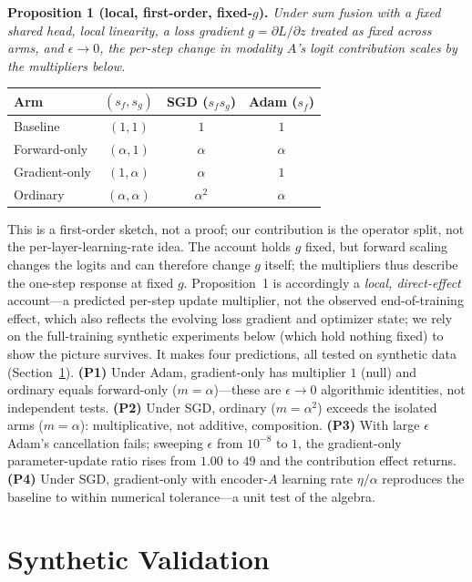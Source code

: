 \documentclass[conference]{IEEEtran}
\begin{document}
\noindent\textbf{Proposition 1 (local, first-order, fixed-$g$).} \emph{Under sum fusion with a fixed shared head, local linearity, a loss gradient $g=\partial L/\partial z$ treated as fixed across arms, and $\epsilon\!\to\!0$, the per-step change in modality $A$'s logit contribution scales by the multipliers below.}
\begin{center}\footnotesize
\begin{tabular}{@{}lccc@{}}
\toprule
Arm & $(s_f,s_g)$ & SGD ($s_f s_g$) & Adam ($s_f$)\\
\midrule
Baseline      & $(1,1)$           & $1$        & $1$\\
Forward-only  & $(\alpha,1)$      & $\alpha$   & $\alpha$\\
Gradient-only & $(1,\alpha)$      & $\alpha$   & $1$\\
Ordinary      & $(\alpha,\alpha)$ & $\alpha^2$ & $\alpha$\\
\bottomrule
\end{tabular}
\end{center}

This is a first-order sketch, not a proof; our contribution is the operator split, not the per-layer-learning-rate idea. The account holds $g$ fixed, but forward scaling changes the logits and can therefore change $g$ itself; the multipliers thus describe the one-step response at fixed $g$. Proposition~1 is accordingly a \emph{local, direct-effect} account---a predicted per-step update multiplier, not the observed end-of-training effect, which also reflects the evolving loss gradient and optimizer state; we rely on the full-training synthetic experiments below (which hold nothing fixed) to show the picture survives. It makes four predictions, all tested on synthetic data (Section~\ref{sec:synthetic}). \textbf{(P1)} Under Adam, gradient-only has multiplier $1$ (null) and ordinary equals forward-only ($m{=}\alpha$)---these are $\epsilon\!\to\!0$ algorithmic identities, not independent tests. \textbf{(P2)} Under SGD, ordinary ($m{=}\alpha^2$) exceeds the isolated arms ($m{=}\alpha$): multiplicative, not additive, composition. \textbf{(P3)} With large $\epsilon$ Adam's cancellation fails; sweeping $\epsilon$ from $10^{-8}$ to $1$, the gradient-only parameter-update ratio rises from $1.00$ to $49$ and the contribution effect returns. \textbf{(P4)} Under SGD, gradient-only with encoder-$A$ learning rate $\eta/\alpha$ reproduces the baseline to within numerical tolerance---a unit test of the algebra.

\section{Synthetic Validation}
\label{sec:synthetic}
\end{document}
